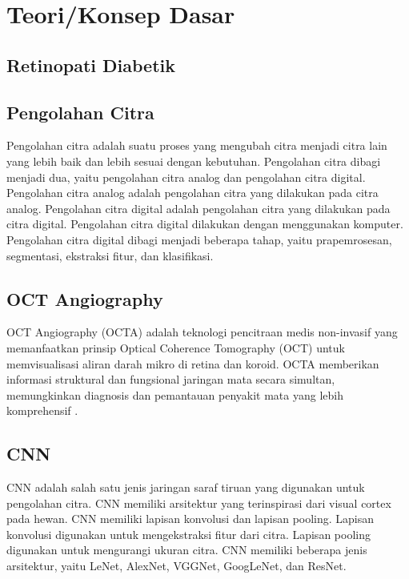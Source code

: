 \section{Teori/Konsep Dasar}
\label{sec:22}

\subsection{Retinopati Diabetik}

\subsection{Pengolahan Citra}
\label{sec:221}

Pengolahan citra adalah suatu proses yang mengubah citra menjadi citra lain yang lebih baik dan lebih sesuai dengan kebutuhan. Pengolahan citra dibagi menjadi dua, yaitu pengolahan citra analog dan pengolahan citra digital. Pengolahan citra analog adalah pengolahan citra yang dilakukan pada citra analog. Pengolahan citra digital adalah pengolahan citra yang dilakukan pada citra digital. Pengolahan citra digital dilakukan dengan menggunakan komputer. Pengolahan citra digital dibagi menjadi beberapa tahap, yaitu prapemrosesan, segmentasi, ekstraksi fitur, dan klasifikasi.

\subsection{OCT Angiography}
\label{sec:222}

OCT Angiography (OCTA) adalah teknologi pencitraan medis non-invasif yang memanfaatkan prinsip Optical Coherence Tomography (OCT) untuk memvisualisasi aliran darah mikro di retina dan koroid. OCTA memberikan informasi struktural dan fungsional jaringan mata secara simultan, memungkinkan diagnosis dan pemantauan penyakit mata yang lebih komprehensif \parencite{Kashani2017-hn}.

\subsection{CNN}
\label{sec:223}

CNN adalah salah satu jenis jaringan saraf tiruan yang digunakan untuk pengolahan citra. CNN memiliki arsitektur yang terinspirasi dari visual cortex pada hewan. CNN memiliki lapisan konvolusi dan lapisan pooling. Lapisan konvolusi digunakan untuk mengekstraksi fitur dari citra. Lapisan pooling digunakan untuk mengurangi ukuran citra. CNN memiliki beberapa jenis arsitektur, yaitu LeNet, AlexNet, VGGNet, GoogLeNet, dan ResNet.

